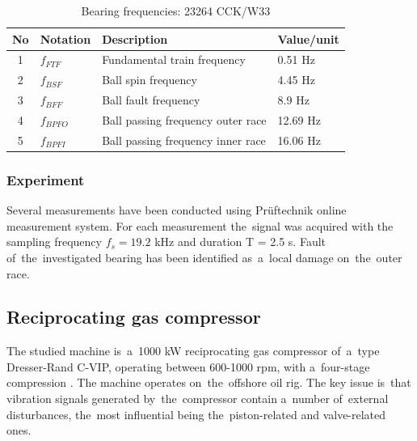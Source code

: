 \begin{table}
\begin{center}
	\begin{tabular}{|c|l|l|l|}
		\hline
		No & Notation & Description & Value/unit \\ \hline
		1 & $f_{FTF}$ & Fundamental train frequency & 0.51 Hz \\ \hline
		2 & $f_{BSF}$ & Ball spin frequency & 4.45 Hz \\ \hline
		3 & $f_{BFF}$ & Ball fault frequency & 8.9 Hz \\ \hline
		4 & $f_{BPFO}$ & Ball passing frequency outer race & 12.69 Hz \\ \hline
		5 & $f_{BPFI}$ & Ball passing frequency inner race & 16.06 Hz \\ \hline
		
	\end{tabular}
\end{center} 
\caption{Bearing frequencies: 23264 CCK/W33}
\label{loz_table}
\end{table}


\subsubsection{Experiment}

Several measurements have been conducted using Pr{\"u}ftechnik online measurement system. For each measurement the~signal was acquired with the~ sampling frequency $f_s = 19.2$ kHz and duration T = 2.5 s. Fault of~the~investigated bearing has been identified as~a~local damage on~the~outer race.

\subsection{Reciprocating gas compressor}

The studied machine is~a~1000 kW reciprocating gas compressor of~a~type Dresser-Rand C-VIP, operating between 600-1000 rpm, with a~four-stage compression \cite{barszcz2013bearings}. The machine operates on~the~offshore oil rig. The key issue is~that vibration signals generated by~the~compressor contain a~number of~external disturbances, the~most influential being the~piston-related and valve-related ones. 

